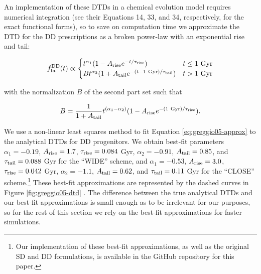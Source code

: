 \documentclass[twocolumn]{aastex631}
\begin{document}
An implementation of these DTDs in a chemical evolution model requires numerical integration (see their Equations 14, 33, and 34, respectively, for the exact functional forms), so to save on computation time we approximate the DTD for the DD prescriptions as a broken power-law with an exponential rise and tail:

\begin{equation}
    f_{\rm{Ia}}^{\rm{DD}}(t) \propto
    \begin{cases}
        t^{\alpha_1} (1 - A_{\rm{rise}} e^{-t/\tau_{\rm{rise}}}) & t \le 1~\rm{Gyr} \\
        B t^{\alpha_2} (1 + A_{\rm{tail}} e^{-(t - 1~\rm{Gyr})/\tau_{\rm{tail}}}) & t > 1~\rm{Gyr}
    \end{cases}
    \label{eq:greggio05-approx}
\end{equation}

\noindent with the normalization $B$ of the second part set such that

\begin{equation}
    B = \frac{1}{1 + A_{\rm{tail}}} t^{(\alpha_1-\alpha_2)} (1 - A_{\rm{rise}} e^{-(1~\rm{Gyr})/\tau_{\rm{rise}}}).
\end{equation}

\noindent We use a non-linear least squares method to fit Equation \ref{eq:greggio05-approx} to the analytical DTDs for DD progenitors. We obtain best-fit parameters $\alpha_1=-0.19$, $A_{\rm{rise}}=1.7$, $\tau_{\rm{rise}}=0.084$ Gyr, $\alpha_2=-0.91$, $A_{\rm{tail}}=0.85$, and $\tau_{\rm{tail}}=0.088$ Gyr for the ``WIDE'' scheme, and $\alpha_1=-0.53$, $A_{\rm{rise}}=3.0$, $\tau_{\rm{rise}}=0.042$ Gyr, $\alpha_2=-1.1$, $A_{\rm{tail}}=0.62$, and $\tau_{\rm{tail}}=0.11$ Gyr for the ``CLOSE'' scheme.\footnote{
Our implementation of these best-fit approximations, as well as the original SD and DD formulations, is available in the GitHub repository for this paper.
} These best-fit approximations are represented by the dashed curves in Figure \ref{fig:greggio05-dtd} \citep[see also Figure 8 in][]{Greggio2005-AnalyticalRates}. The difference between the true analytical DTDs and our best-fit approximations is small enough as to be irrelevant for our purposes, so for the rest of this section we rely on the best-fit approximations for faster simulations.

\end{document}
